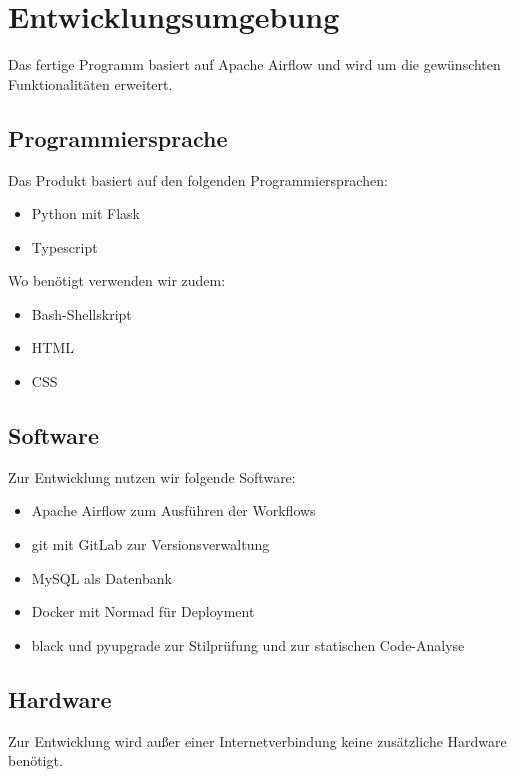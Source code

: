 \chapter{Entwicklungsumgebung}
Das fertige Programm basiert auf \gls{Apache Airflow} und wird um die gewünschten Funktionalitäten erweitert.
\section{Programmiersprache}
Das Produkt basiert auf den folgenden Programmiersprachen:
\begin{itemize}
    \setlength\itemsep{-1em}
    \item Python mit Flask
    \item Typescript
\end{itemize}
Wo benötigt verwenden wir zudem:
\begin{itemize}
    \setlength\itemsep{-1em}
    \item Bash-Shellskript 
    \item HTML
    \item CSS
\end{itemize}

\section{Software}
Zur Entwicklung nutzen wir folgende Software:
\begin{itemize}
    \setlength\itemsep{-1em}
    \item Apache Airflow zum Ausführen der \glspl{Workflow}
    \item git mit GitLab zur Versionsverwaltung
    \item MySQL als Datenbank
    \item Docker mit Normad für Deployment
    \item black und pyupgrade zur Stilprüfung und zur statischen Code-Analyse
\end{itemize}


\section{Hardware}
Zur Entwicklung wird außer einer Internetverbindung keine zusätzliche Hardware benötigt.